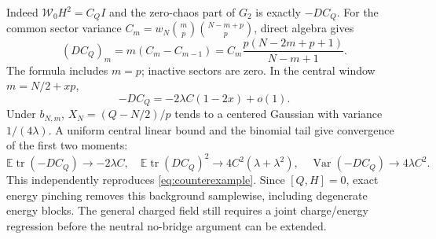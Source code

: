 \documentclass[11pt]{article}
\newcommand{\EE}{\mathbb E}
\newcommand{\tr}{\operatorname{tr}}
\newcommand{\WW}{\mathcal W}
\begin{document}
Indeed $\WW_0H^2=C_QI$ and the zero-chaos part of $G_2$ is exactly
$-DC_Q$. For the common sector variance
$C_m=w_N\binom mp\binom{N-m+p}p$, direct algebra gives
\begin{equation}
 (DC_Q)_m=m(C_m-C_{m-1})
     =C_m\frac{p(N-2m+p+1)}{N-m+1}.\label{eq:chargeexact}
\end{equation}
The formula includes $m=p$; inactive sectors are zero.
In the central window $m=N/2+xp$,
\begin{equation}
 -DC_Q=-2\lambda C(1-2x)+o(1).
\end{equation}
Under $b_{N,m}$, $X_N=(Q-N/2)/p$ tends to a centered Gaussian
with variance $1/(4\lambda)$. A uniform central linear bound and
the binomial tail give convergence of the first two moments:
\begin{equation}
 \EE\tr(-DC_Q)\to-2\lambda C,\quad
 \EE\tr(DC_Q)^2\to4C^2(\lambda+\lambda^2),\quad
 \operatorname{Var}(-DC_Q)\to4\lambda C^2.\label{eq:chargemom}
\end{equation}
This independently reproduces \eqref{eq:counterexample}. Since
$[Q,H]=0$, exact energy pinching removes this background samplewise,
including degenerate energy blocks. The general charged field still
requires a joint charge/energy regression before the neutral
no-bridge argument can be extended.

\newpage
\end{document}
